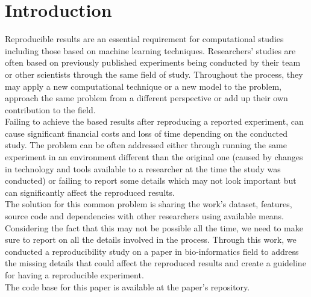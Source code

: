 \section {Introduction}


Reproducible results are an essential requirement for computational studies including those based on machine learning techniques. 
Researchers' studies are often based on previously published experiments being conducted by their team or other scientists 
through the same field of study. 
Throughout the process, they may apply a new computational technique or a new model to the problem, 
approach the same problem from a different perspective or add up their own contribution to the field. \\

Failing to achieve the based results after reproducing a reported experiment, can cause significant financial costs 
and loss of time depending on the conducted study. The problem can be often addressed either through running the same 
experiment in an environment different than the original one (caused by changes in technology and tools available to a 
researcher at the time the study was conducted) or failing to report some details which may not look important but 
can significantly affect the reproduced results. \\

The solution for this common problem is sharing the work's dataset, features, source code and dependencies with other 
researchers using available means. Considering the fact that this may not be possible all the time, we need to make 
sure to report on all the details involved in the process. Through this work, we conducted a reproducibility study on a paper 
in bio-informatics field to address the missing details that could affect the reproduced results and create a guideline for 
having a reproducible experiment.\\

The code base for this paper is available at the paper's  repository.
